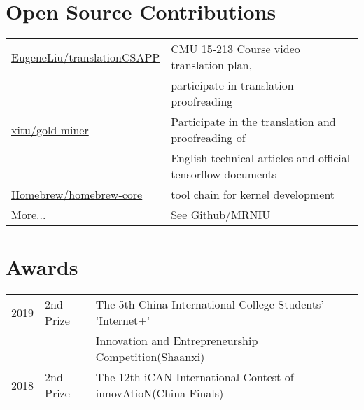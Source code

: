 \documentclass[]{deedy-resume-openfont}
\begin{document}
\begin{minipage}[t]{0.73\textwidth}
\section{Open Source Contributions}
\begin{tabular}{ll}
    \href{https://github.com/EugeneLiu/translationCSAPP}{EugeneLiu/translationCSAPP} & CMU 15-213 Course video translation plan, \\
        & participate in translation proofreading \\
    \href{https://github.com/xitu/gold-miner}{xitu/gold-miner} & Participate in the translation and proofreading of \\
        & English technical articles and official tensorflow documents \\
    \href{https://github.com/Homebrew/homebrew-core}{Homebrew/homebrew-core} & tool chain for kernel development \\
    More... & See \href{https://github.com/MRNIU}{Github/MRNIU}
\end{tabular}
\sectionsep


\section{Awards} 
\begin{tabular}{rll}
    2019         & 2nd Prize  & The 5th China International College Students' 'Internet+' \\
                 &            & Innovation and Entrepreneurship Competition(Shaanxi) \\
    2018	     & 2nd Prize  & The 12th iCAN International Contest of innovAtioN(China Finals) \\
\end{tabular}
\sectionsep


% 
% 

\end{minipage} 
\end{document}
